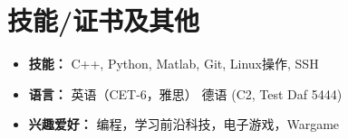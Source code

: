 \documentclass{resume}
\begin{document}
\section{技能/证书及其他}
\begin{itemize}[parsep=0.2ex]
  \item \textbf{技能：} C++, Python, Matlab, Git, Linux操作, SSH
  \item \textbf{语言：} 英语（CET-6，雅思） 德语 (C2, Test Daf 5444)
  \item \textbf{兴趣爱好：} 编程，学习前沿科技，电子游戏，Wargame
\end{itemize}





%
%
\end{document}
